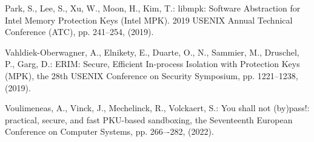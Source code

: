 \documentclass[paper]{ieice}
\begin{document}
\begin{thebibliography}{99}
Park, S., Lee, S., Xu, W., Moon, H., Kim, T.: libmpk: Software Abstraction for Intel Memory Protection Keys (Intel MPK).
    2019 USENIX Annual Technical Conference (ATC), pp. 241--254, (2019).    
    

  Vahldiek-Oberwagner, A., Elnikety, E., Duarte, O., N., Sammier, M., Druschel, P., Garg, D.:
  ERIM: Secure, Efficient In-process Isolation with Protection Keys (MPK), the 28th USENIX Conference on Security Symposium, pp. 1221--1238, (2019).

Voulimeneas, A., Vinck, J., Mechelinck, R., Volckaert, S.: You shall not (by)pass!: practical, secure, and fast PKU-based sandboxing, the Seventeenth European Conference on Computer Systems, pp. 266–-282, (2022).



\end{thebibliography}
\end{document}

